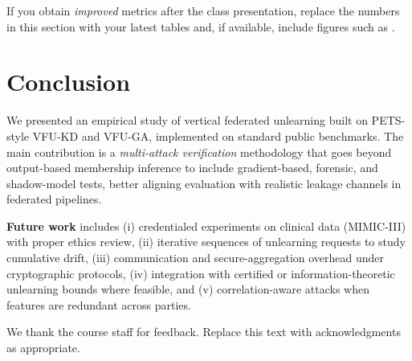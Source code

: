 \documentclass[sigconf,screen]{acmart}
\begin{document}
If you obtain \emph{improved} metrics after the class presentation, replace the numbers in this section with your latest tables and, if available, include figures such as .

\section{Conclusion}

We presented an empirical study of vertical federated unlearning built on PETS-style \textsc{VFU-KD} and \textsc{VFU-GA}, implemented on standard public benchmarks. The main contribution is a \emph{multi-attack verification} methodology that goes beyond output-based membership inference to include gradient-based, forensic, and shadow-model tests, better aligning evaluation with realistic leakage channels in federated pipelines.

\textbf{Future work} includes (i) credentialed experiments on clinical data (MIMIC-III) with proper ethics review, (ii) iterative sequences of unlearning requests to study cumulative drift, (iii) communication and secure-aggregation overhead under cryptographic protocols, (iv) integration with certified or information-theoretic unlearning bounds where feasible, and (v) correlation-aware attacks when features are redundant across parties.

\begin{acks}
We thank the course staff for feedback. Replace this text with acknowledgments as appropriate.
\end{acks}



\end{document}
